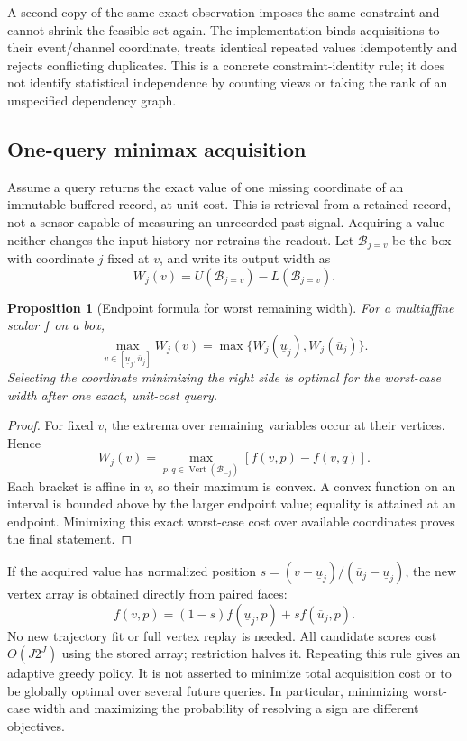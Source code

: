 \documentclass[11pt,a4paper]{article}
\newtheorem{proposition}[theorem]{Proposition}
\theoremstyle{definition}\newtheorem{definition}[theorem]{Definition}
\begin{document}
A second copy of the same exact observation imposes the same constraint and cannot shrink the feasible set again. The implementation binds acquisitions to their event/channel coordinate, treats identical repeated values idempotently and rejects conflicting duplicates. This is a concrete constraint-identity rule; it does not identify statistical independence by counting views or taking the rank of an unspecified dependency graph.

\subsection{One-query minimax acquisition}\label{sec:query}
Assume a query returns the exact value of one missing coordinate of an immutable buffered record, at unit cost. This is retrieval from a retained record, not a sensor capable of measuring an unrecorded past signal. Acquiring a value neither changes the input history nor retrains the readout. Let $\mathcal B_{j=v}$ be the box with coordinate $j$ fixed at $v$, and write its output width as
\[
 W_j(v)=U(\mathcal B_{j=v})-L(\mathcal B_{j=v}).
\]
\begin{proposition}[Endpoint formula for worst remaining width]\label{prop:query}
For a multiaffine scalar $f$ on a box,
\begin{equation}
 \max_{v\in[\underline u_j,\overline u_j]}W_j(v)
 =\max\{W_j(\underline u_j),W_j(\overline u_j)\}.\label{eq:querywidth}
\end{equation}
Selecting the coordinate minimizing the right side is optimal for the worst-case width after one exact, unit-cost query.
\end{proposition}
\begin{proof}
For fixed $v$, the extrema over remaining variables occur at their vertices. Hence
\[
 W_j(v)=\max_{p,q\in\operatorname{Vert}(\mathcal B_{-j})}
               [f(v,p)-f(v,q)].
\]
Each bracket is affine in $v$, so their maximum is convex. A convex function on an interval is bounded above by the larger endpoint value; equality is attained at an endpoint. Minimizing this exact worst-case cost over available coordinates proves the final statement.
\end{proof}

If the acquired value has normalized position $s=(v-\underline u_j)/(\overline u_j-\underline u_j)$, the new vertex array is obtained directly from paired faces:
\begin{equation}
 f(v,p)=(1-s)f(\underline u_j,p)+s f(\overline u_j,p).\label{eq:restrictvertices}
\end{equation}
No new trajectory fit or full vertex replay is needed. All candidate scores cost $O(J2^J)$ using the stored array; restriction halves it. Repeating this rule gives an adaptive greedy policy. It is not asserted to minimize total acquisition cost or to be globally optimal over several future queries. In particular, minimizing worst-case width and maximizing the probability of resolving a sign are different objectives.
\end{document}
